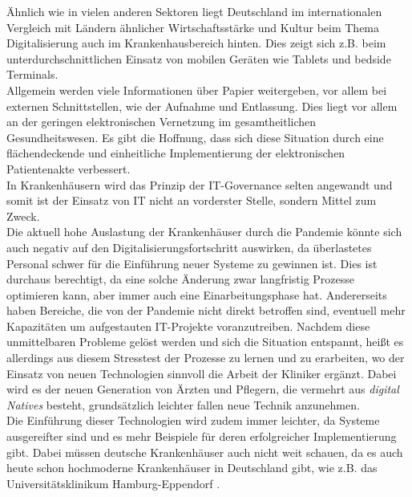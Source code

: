 Ähnlich wie in vielen anderen Sektoren liegt Deutschland im internationalen Vergleich mit Ländern ähnlicher Wirtschaftsstärke und Kultur beim Thema Digitalisierung auch im Krankenhausbereich hinten. Dies zeigt sich z.B. beim unterdurchschnittlichen Einsatz von mobilen Geräten wie Tablets und bedside Terminals.\\

Allgemein werden viele Informationen über Papier weitergeben, vor allem bei externen Schnittstellen, wie der Aufnahme und Entlassung. Dies liegt vor allem an der geringen elektronischen Vernetzung im gesamtheitlichen Gesundheitswesen. Es gibt die Hoffnung, dass sich diese Situation durch eine flächendeckende und einheitliche Implementierung der elektronischen Patientenakte verbessert.\\

In Krankenhäusern wird das Prinzip der IT-Governance selten angewandt und somit ist der Einsatz von IT nicht an vorderster Stelle, sondern Mittel zum Zweck.\\

Die aktuell hohe Auslastung der Krankenhäuser durch die Pandemie könnte sich auch negativ auf den Digitalisierungsfortschritt auswirken, da überlastetes Personal schwer für die Einführung neuer Systeme zu gewinnen ist. Dies ist durchaus berechtigt, da eine solche Änderung zwar langfristig Prozesse optimieren kann, aber immer auch eine Einarbeitungsphase hat. Andererseits haben Bereiche, die von der Pandemie nicht direkt betroffen sind, eventuell mehr Kapazitäten um aufgestauten IT-Projekte voranzutreiben. Nachdem diese unmittelbaren Probleme gelöst werden und sich die Situation entspannt, heißt es allerdings aus diesem Stresstest der Prozesse zu lernen und zu erarbeiten, wo der Einsatz von neuen Technologien sinnvoll die Arbeit der Kliniker ergänzt. Dabei wird es der neuen Generation von Ärzten und Pflegern, die vermehrt aus \textit{digital Natives} besteht, grundsätzlich leichter fallen neue Technik anzunehmen.\\

Die Einführung dieser Technologien wird zudem immer leichter, da Systeme ausgereifter sind und es mehr Beispiele für deren erfolgreicher Implementierung gibt. Dabei müssen deutsche Krankenhäuser auch nicht weit schauen, da es auch heute schon hochmoderne Krankenhäuser in Deutschland gibt, wie z.B. das Universitätsklinikum Hamburg-Eppendorf \parencite{Baehr2019}.
